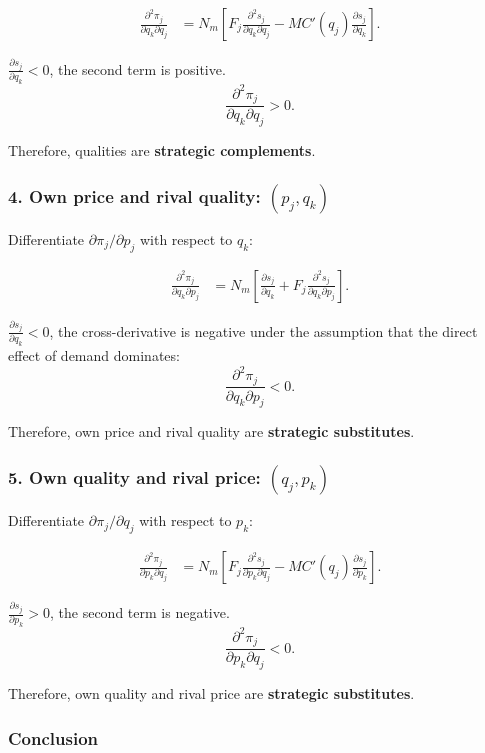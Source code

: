 \documentclass[12pt]{article}
\begin{document}
\begin{align}
\frac{\partial^2 \pi_j}{\partial q_k \partial q_j}
&=
N_m\left[
F_j\frac{\partial^2 s_j}{\partial q_k \partial q_j}
-
MC'(q_j)\frac{\partial s_j}{\partial q_k}
\right].
\end{align}

$\frac{\partial s_j}{\partial q_k}<0$, the second term is positive.
\[
\frac{\partial^2 \pi_j}{\partial q_k \partial q_j}>0.
\]

Therefore, qualities are \textbf{strategic complements}.

\subsubsection*{4. Own price and rival quality: $(p_j,q_k)$}

Differentiate $\partial \pi_j / \partial p_j$ with respect to $q_k$:

\begin{align}
\frac{\partial^2 \pi_j}{\partial q_k \partial p_j}
&=
N_m\left[
\frac{\partial s_j}{\partial q_k}
+
F_j\frac{\partial^2 s_j}{\partial q_k \partial p_j}
\right].
\end{align}

$\frac{\partial s_j}{\partial q_k}<0$, the cross-derivative is negative under the assumption that the direct effect of demand dominates:
\[
\frac{\partial^2 \pi_j}{\partial q_k \partial p_j}<0.
\]

Therefore, own price and rival quality are \textbf{strategic substitutes}.

\subsubsection*{5. Own quality and rival price: $(q_j,p_k)$}

Differentiate $\partial \pi_j / \partial q_j$ with respect to $p_k$:

\begin{align}
\frac{\partial^2 \pi_j}{\partial p_k \partial q_j}
&=
N_m\left[
F_j\frac{\partial^2 s_j}{\partial p_k \partial q_j}
-
MC'(q_j)\frac{\partial s_j}{\partial p_k}
\right].
\end{align}

$\frac{\partial s_j}{\partial p_k}>0$, the second term is negative.
\[
\frac{\partial^2 \pi_j}{\partial p_k \partial q_j}<0.
\]

Therefore, own quality and rival price are \textbf{strategic substitutes}.

\subsubsection*{Conclusion}
\end{document}
